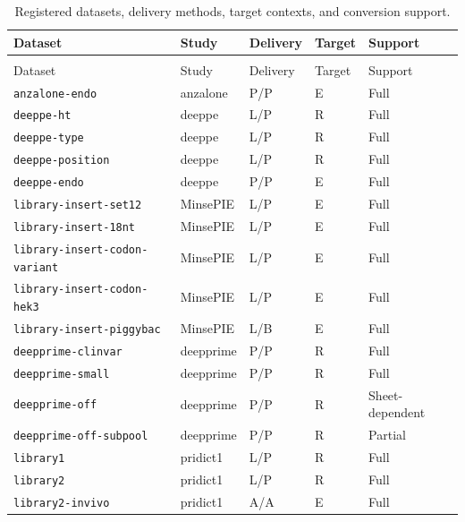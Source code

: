 \documentclass{article}
\begin{document}
\begingroup
\small
\setlength{\tabcolsep}{4pt}
\renewcommand{\arraystretch}{1.15}
\begin{longtable}{@{}>{\raggedright\arraybackslash}p{}>{\raggedright\arraybackslash}p{}p{}p{}>{\raggedright\arraybackslash}p{}@{}}
    \caption{Registered datasets, delivery methods, target contexts, and conversion support.} \label{tab:app-datasets-summary} \\
    \hline
    Dataset & Study & Delivery & Target & Support \\
    \hline
    \endfirsthead
    \multicolumn{5}{l}{\textit{Dataset catalog (continued)}} \\
    \hline
    Dataset & Study & Delivery & Target & Support \\
    \hline
    \endhead
    \hline
    \endfoot
    \endlastfoot
    \nolinkurl{anzalone-endo} & anzalone & P/P & E & Full \\
    \nolinkurl{deeppe-ht} & deeppe & L/P & R & Full \\
    \nolinkurl{deeppe-type} & deeppe & L/P & R & Full \\
    \nolinkurl{deeppe-position} & deeppe & L/P & R & Full \\
    \nolinkurl{deeppe-endo} & deeppe & P/P & E & Full \\
    \nolinkurl{library-insert-set12} & MinsePIE & L/P & E & Full \\
    \nolinkurl{library-insert-18nt} & MinsePIE & L/P & E & Full \\
    \nolinkurl{library-insert-codon-variant} & MinsePIE & L/P & E & Full \\
    \nolinkurl{library-insert-codon-hek3} & MinsePIE & L/P & E & Full \\
    \nolinkurl{library-insert-piggybac} & MinsePIE & L/B & E & Full \\
    \nolinkurl{deepprime-clinvar} & deepprime & P/P & R & Full \\
    \nolinkurl{deepprime-small} & deepprime & P/P & R & Full \\
    \nolinkurl{deepprime-off} & deepprime & P/P & R & Sheet-dependent \\
    \nolinkurl{deepprime-off-subpool} & deepprime & P/P & R & Partial \\
    \nolinkurl{library1} & pridict1 & L/P & R & Full \\
    \nolinkurl{library2} & pridict1 & L/P & R & Full \\
    \nolinkurl{library2-invivo} & pridict1 & A/A & E & Full \\

\end{longtable}
\end{document}
